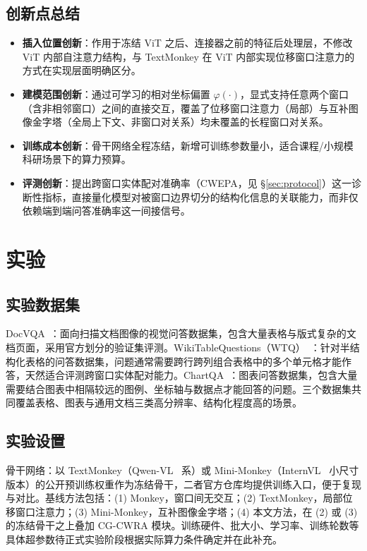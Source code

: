 \documentclass[journal]{IEEEtran}
\begin{document}
\subsection{创新点总结}
\begin{itemize}
\item \textbf{插入位置创新}：作用于冻结 ViT 之后、连接器之前的特征后处理层，不修改 ViT 内部自注意力结构，与 TextMonkey 在 ViT 内部实现位移窗口注意力的方式在实现层面明确区分。
\item \textbf{建模范围创新}：通过可学习的相对坐标偏置 $\varphi(\cdot)$，显式支持任意两个窗口（含非相邻窗口）之间的直接交互，覆盖了位移窗口注意力（局部）与互补图像金字塔（全局上下文、非窗口对关系）均未覆盖的长程窗口对关系。
\item \textbf{训练成本创新}：骨干网络全程冻结，新增可训练参数量小，适合课程/小规模科研场景下的算力预算。
\item \textbf{评测创新}：提出跨窗口实体配对准确率（CWEPA，见 \S\ref{sec:protocol}）这一诊断性指标，直接量化模型对被窗口边界切分的结构化信息的关联能力，而非仅依赖端到端问答准确率这一间接信号。
\end{itemize}

\section{实验}

\subsection{实验数据集}
DocVQA~\cite{docvqa}：面向扫描文档图像的视觉问答数据集，包含大量表格与版式复杂的文档页面，采用官方划分的验证集评测。WikiTableQuestions（WTQ）~\cite{wtq}：针对半结构化表格的问答数据集，问题通常需要跨行跨列组合表格中的多个单元格才能作答，天然适合评测跨窗口实体配对能力。ChartQA~\cite{chartqa}：图表问答数据集，包含大量需要结合图表中相隔较远的图例、坐标轴与数据点才能回答的问题。三个数据集共同覆盖表格、图表与通用文档三类高分辨率、结构化程度高的场景。

\subsection{实验设置}
骨干网络：以 TextMonkey（Qwen-VL~\cite{qwenvl} 系）或 Mini-Monkey（InternVL~\cite{internvl} 小尺寸版本）的公开预训练权重作为冻结骨干，二者官方仓库均提供训练入口，便于复现与对比。基线方法包括：(1) Monkey，窗口间无交互；(2) TextMonkey，局部位移窗口注意力；(3) Mini-Monkey，互补图像金字塔；(4) 本文方法，在 (2) 或 (3) 的冻结骨干之上叠加 CG-CWRA 模块。训练硬件、批大小、学习率、训练轮数等具体超参数待正式实验阶段根据实际算力条件确定并在此补充。
\end{document}
